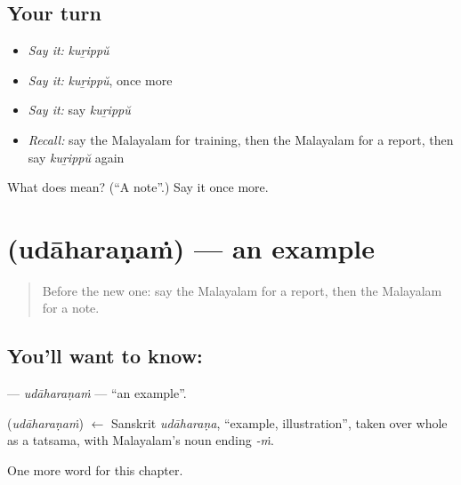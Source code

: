 \subsection*{Your turn}
\begin{itemize}
\raggedright
  \item \emph{Say it:} \emph{kuṟippŭ}
  \item \emph{Say it:} \emph{kuṟippŭ}, once more
  \item \emph{Say it:} say \emph{kuṟippŭ}
  \item \emph{Recall:} say the Malayalam for training, then the Malayalam for a report, then say \emph{kuṟippŭ} again
\end{itemize}

\begin{tcolorbox}[breakable,colback=teal!4,colframe=teal!35!black,title={Before you move on}]
What does  mean? (\textquotedblleft{}A note\textquotedblright{}.) Say it once more.
\end{tcolorbox}
\section[\texorpdfstring{\ml{ഉദാഹരണം} (udāharaṇaṁ)}{ഉദാഹരണം (udāharaṇaṁ)}]{ (udāharaṇaṁ) — an example}

\label{lesson:ML-C262-udaharanam}



\begin{quote}
Before the new one: say the Malayalam for a report, then the Malayalam for a note.
\end{quote}

\subsection*{You'll want to know: }
\textbf{} — \emph{udāharaṇaṁ} — \textquotedblleft{}an example\textquotedblright{}.

\begin{cousinweb}
\textbf{} (\emph{udāharaṇaṁ}) $\leftarrow$ Sanskrit \emph{udāharaṇa}, \textquotedblleft{}example, illustration\textquotedblright{}, taken over whole as a tatsama, with Malayalam's noun ending \emph{-ṁ}.
\end{cousinweb}

\begin{grammarlens}[title={What you've built}]
One more word for this chapter.
\end{grammarlens}

